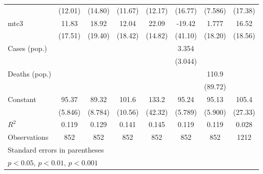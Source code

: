 \documentclass{article}
\begin{document}
{\begin{longtable}{l*{7}{c}}
                &  (12.01)         &  (14.80)         &  (11.67)         &  (12.17)         &  (16.77)         &  (7.586)         &  (17.38)         \\
mtc3            &    11.83         &    18.92         &    12.04         &    22.09         &   -19.42         &    1.777         &    16.52         \\
                &  (17.51)         &  (19.40)         &  (18.42)         &  (14.82)         &  (41.10)         &  (18.20)         &  (18.56)         \\
Cases (pop.)    &                  &                  &                  &                  &    3.354         &                  &                  \\
                &                  &                  &                  &                  &  (3.044)         &                  &                  \\
Deaths (pop.)   &                  &                  &                  &                  &                  &    110.9         &                  \\
                &                  &                  &                  &                  &                  &  (89.72)         &                  \\
Constant        &    95.37\sym{***}&    89.32\sym{***}&    101.6\sym{***}&    133.2\sym{*}  &    95.24\sym{***}&    95.13\sym{***}&    105.4\sym{*}  \\
                &  (5.846)         &  (8.784)         &  (10.56)         &  (42.32)         &  (5.789)         &  (5.900)         &  (27.33)         \\
\hline
\(R^{2}\)       &    0.119         &    0.129         &    0.141         &    0.145         &    0.119         &    0.119         &    0.028         \\
Observations    &      852         &      852         &      852         &      852         &      852         &      852         &     1212         \\
\hline\hline
\multicolumn{8}{l}{\footnotesize Standard errors in parentheses}\\
\multicolumn{8}{l}{\footnotesize \sym{*} \(p<0.05\), \sym{**} \(p<0.01\), \sym{***} \(p<0.001\)}\\
\end{longtable}
}
\end{document}

